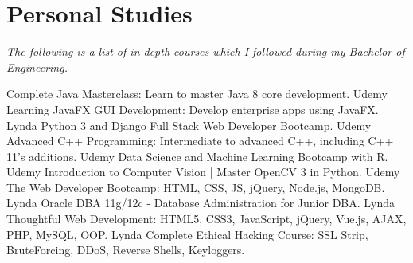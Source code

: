 \documentclass[]{friggeri-cv} %
\begin{document}
\patchcmd{\entry}{11.8cm}{14.8cm}{}{}
\section{Personal Studies}
\vspace{-3mm}
\emph{\small{The following is a list of in-depth courses which I followed during my Bachelor of Engineering.}}

\begin{entrylist}
\entry
{}
{Complete Java Masterclass: {\normalfont\small{Learn to master Java 8 core development.}}}
{Udemy}
{\vspace{-3mm}}
\entry
{}
{Learning JavaFX GUI Development: {\normalfont\small{Develop enterprise apps using JavaFX.}}}
{Lynda}
{\vspace{-3mm}}
\entry
{}
{Python 3 and Django Full Stack Web Developer Bootcamp{\normalfont\small{.}}}
{Udemy}
{\vspace{-3mm}}
\entry
{}
{Advanced C++ Programming: {\normalfont\small{Intermediate to advanced C++, including C++ 11's additions.}}}
{Udemy}
{\vspace{-3mm}}
\entry
{}
{Data Science and Machine Learning Bootcamp with R{\normalfont\small{.}}}
{Udemy}
{\vspace{-3mm}}
\entry
{}
{Introduction to Computer Vision | Master OpenCV 3 in Python{\normalfont\small{.}}}
{Udemy}
{\vspace{-3mm}}
\entry
{}
{The Web Developer Bootcamp: {\normalfont\small{HTML, CSS, JS, jQuery, Node.js, MongoDB.}}}
{Lynda}
{\vspace{-3mm}}
\entry
{}
{Oracle DBA 11g/12c - Database Administration for Junior DBA{\normalfont\small{.}}}
{Lynda}
{\vspace{-3mm}}
\entry
{}
{Thoughtful Web Development: {\normalfont\small{HTML5, CSS3, JavaScript, jQuery, Vue.js, AJAX, PHP, MySQL, OOP.}}}
{Lynda}
{\vspace{-3mm}}
\entry
{}
{Complete Ethical Hacking Course: {\normalfont\small{SSL Strip, BruteForcing, DDoS, Reverse Shells, Keyloggers.}}}

\end{entrylist}
\end{document}
